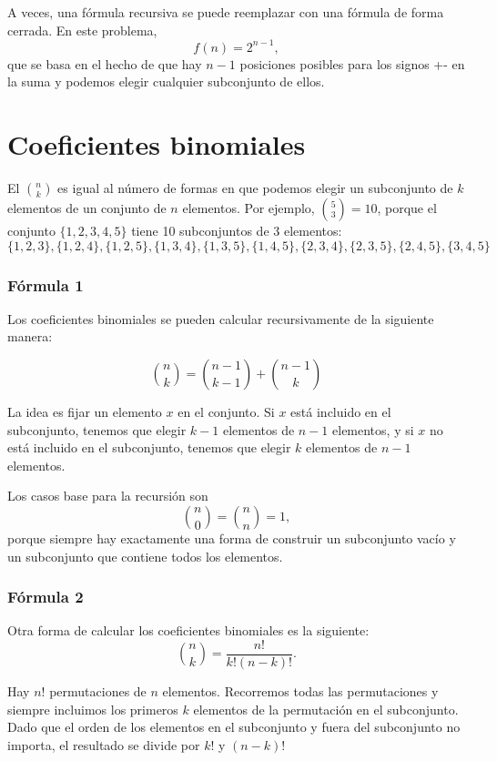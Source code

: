 A veces, una fórmula recursiva se puede reemplazar
con una fórmula de forma cerrada.
En este problema,
\[
f(n)=2^{n-1},
\]
que se basa en el hecho de que hay $n-1$
posiciones posibles para los signos +- en la suma
y podemos elegir cualquier subconjunto de ellos.

\section{Coeficientes binomiales}


El  ${n \choose k}$
es igual al número de formas en que podemos elegir un subconjunto
de $k$ elementos de un conjunto de $n$ elementos.
Por ejemplo, ${5 \choose 3}=10$,
porque el conjunto $\{1,2,3,4,5\}$
tiene 10 subconjuntos de 3 elementos:
\[ \{1,2,3\}, \{1,2,4\}, \{1,2,5\}, \{1,3,4\}, \{1,3,5\}, 
\{1,4,5\}, \{2,3,4\}, \{2,3,5\}, \{2,4,5\}, \{3,4,5\} \]

\subsubsection{Fórmula 1}

Los coeficientes binomiales se pueden
calcular recursivamente de la siguiente manera:

\[
{n \choose k}  =  {n-1 \choose k-1} + {n-1 \choose k}
\]

La idea es fijar un elemento $x$ en el conjunto.
Si $x$ está incluido en el subconjunto,
tenemos que elegir $k-1$
elementos de $n-1$ elementos,
y si $x$ no está incluido en el subconjunto,
tenemos que elegir $k$ elementos de $n-1$ elementos.

Los casos base para la recursión son
\[
{n \choose 0}  =  {n \choose n} = 1,
\]
porque siempre hay exactamente
una forma de construir un subconjunto vacío
y un subconjunto que contiene todos los elementos.

\subsubsection{Fórmula 2}

Otra forma de calcular los coeficientes binomiales es la siguiente:
\[
{n \choose k}  =  \frac{n!}{k!(n-k)!}.
\]

Hay $n!$ permutaciones de $n$ elementos.
Recorremos todas las permutaciones y siempre
incluimos los primeros $k$ elementos de la permutación
en el subconjunto.
Dado que el orden de los elementos en el subconjunto
y fuera del subconjunto no importa,
el resultado se divide por $k!$ y $(n-k)!$

